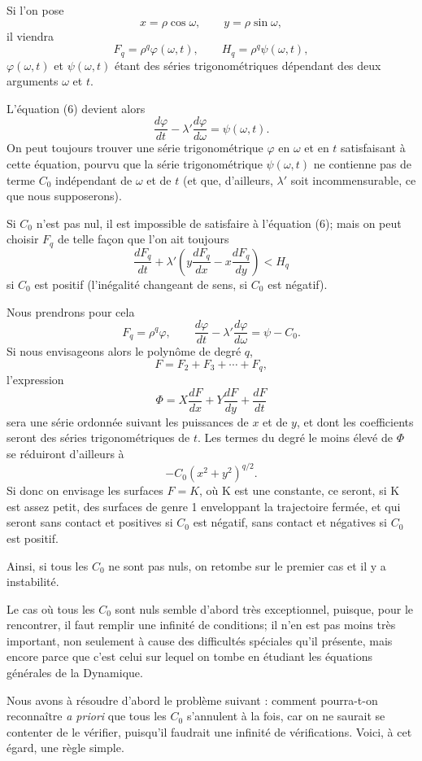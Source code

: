 \documentclass[11pt]{article}
\begin{document}
Si l’on pose
\[
x=\rho\cos\omega,
\qquad
 y=\rho\sin\omega,
\]
il viendra
\[
F_q=\rho^q\varphi(\omega,t),
\qquad
H_q=\rho^q\psi(\omega,t),
\]
$\varphi(\omega,t)$ et $\psi(\omega,t)$ étant des séries trigonométriques dépendant des deux arguments $\omega$ et $t$.

L’équation (6) devient alors
\begin{equation}
\frac{d\varphi}{dt}-\lambda'\frac{d\varphi}{d\omega}=\psi(\omega,t).
\tag{6 bis}
\end{equation}
On peut toujours trouver une série trigonométrique $\varphi$ en $\omega$ et en $t$ satisfaisant à cette équation, pourvu que la série trigonométrique $\psi(\omega,t)$ ne contienne pas de terme $C_0$ indépendant de $\omega$ et de $t$ (et que, d’ailleurs, $\lambda'$ soit incommensurable, ce que nous supposerons).

Si $C_0$ n’est pas nul, il est impossible de satisfaire à l’équation (6); mais on peut choisir $F_q$ de telle façon que l’on ait toujours
\[
\frac{dF_q}{dt}+\lambda'\left(y\frac{dF_q}{dx}-x\frac{dF_q}{dy}\right)<H_q
\]
si $C_0$ est positif (l’inégalité changeant de sens, si $C_0$ est négatif).

Nous prendrons pour cela
\[
F_q=\rho^q\varphi,
\qquad
\frac{d\varphi}{dt}-\lambda'\frac{d\varphi}{d\omega}=\psi-C_0.
\]
Si nous envisageons alors le polynôme de degré $q$,
\[
F=F_2+F_3+\cdots+F_q,
\]
l’expression
\[
\Phi=X\frac{dF}{dx}+Y\frac{dF}{dy}+\frac{dF}{dt}
\]
sera une série ordonnée suivant les puissances de $x$ et de $y$, et dont les coefficients seront des séries trigonométriques de $t$. Les termes du degré le moins élevé de $\Phi$ se réduiront d’ailleurs à
\[
-C_0(x^2+y^2)^{q/2}.
\]
Si donc on envisage les surfaces $F=K$, où K est une constante, ce seront, si K est assez petit, des surfaces de genre 1 enveloppant la trajectoire fermée, et qui seront sans contact et positives si $C_0$ est négatif, sans contact et négatives si $C_0$ est positif.

Ainsi, si tous les $C_0$ ne sont pas nuls, on retombe sur le premier cas et il y a instabilité.

Le cas où tous les $C_0$ sont nuls semble d’abord très exceptionnel, puisque, pour le rencontrer, il faut remplir une infinité de conditions; il n’en est pas moins très important, non seulement à cause des difficultés spéciales qu’il présente, mais encore parce que c’est celui sur lequel on tombe en étudiant les équations générales de la Dynamique.

Nous avons à résoudre d’abord le problème suivant : comment pourra-t-on reconnaître \emph{a priori} que tous les $C_0$ s’annulent à la fois, car on ne saurait se contenter de le vérifier, puisqu’il faudrait une infinité de vérifications. Voici, à cet égard, une règle simple.
\end{document}
